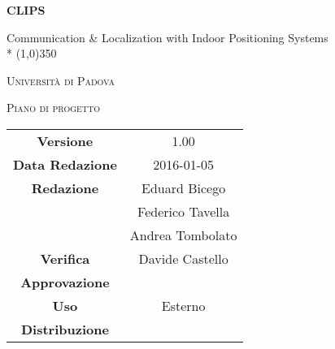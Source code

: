 \documentclass[a4paper,12pt]{article}
\author{Eduard Bicego, Federico Tavella, Andrea Tombolato}
\date{05/01/2016}
\begin{document}
	\begin{titlepage}
		\centering
		{\huge\bfseries CLIPS\par}
		Communication \& Localization with Indoor Positioning Systems \\*
		\line(1,0){350} \\
		{\scshape\LARGE Università di Padova \par}
		\vspace{1cm}
		{\scshape\Large Piano di progetto\par}
		\vspace{2cm}
		\logo
	
		\vfill \vfill
		\begin{tabular}{c|c}
			{\hfill \textbf{Versione}} 			& 1.00				\\
			{\hfill\textbf{Data Redazione}} 	& 2016-01-05  		\\
			{\hfill\textbf{Redazione}} 			& Eduard Bicego  	\\ 
												& Federico Tavella	\\
												& Andrea Tombolato	\\
			{\hfill\textbf{Verifica}} 			& Davide Castello 	\\
			{\hfill\textbf{Approvazione}} 		&  					\\
			{\hfill\textbf{Uso}} 				& Esterno			\\
			{\hfill\textbf{Distribuzione}} 		& \leaf				\\
	\end{tabular}
\end{titlepage}
	
	\newpage
		
	\newpage
		\tableofcontents 	%
	\newpage
		\listoftables 		%
	\newpage	
		\listoffigures		%
	
	\label{LastFrontPage}

	\newpage
		\pagestyle{mymain}
	
	\newpage
		
	
	\newpage
		

	\newpage
		
		
	\newpage
			
		
	\newpage
			

    \newpage
		
		
	\newpage
		
        
    \newpage
		
		
	\label{LastPage}
\end{document}
